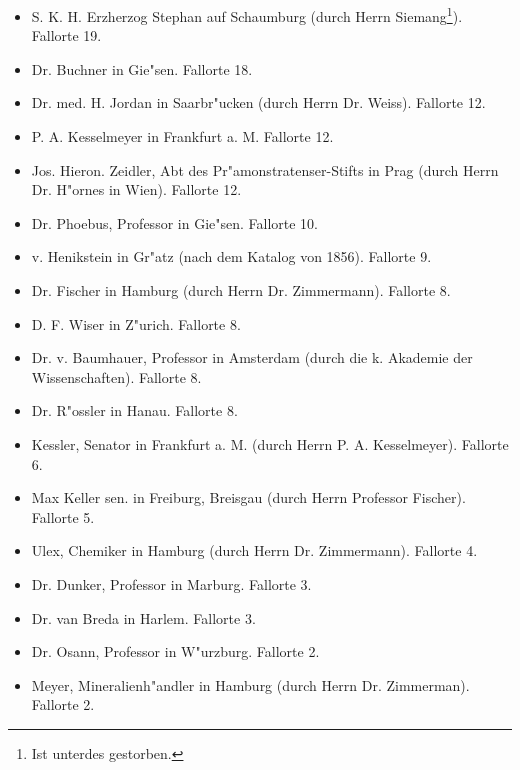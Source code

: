 \documentclass[a4paper, 11pt, oneside]{article}
\begin{document}
\begin{itemize}
    \item S. K. H. Erzherzog Stephan auf Schaumburg (durch Herrn Siemang\footnote{Ist unterdes gestorben.}). Fallorte 19.

    \item Dr. Buchner in Gie"sen. Fallorte 18.

    \item Dr. med. H. Jordan in Saarbr"ucken (durch Herrn Dr. Weiss). Fallorte 12.

    \item P. A. Kesselmeyer in Frankfurt a. M. Fallorte 12.

    \item Jos. Hieron. Zeidler, Abt des Pr"amonstratenser-Stifts in Prag (durch Herrn Dr. H"ornes in Wien). Fallorte 12.

    \item Dr. Phoebus, Professor in Gie"sen. Fallorte 10.

    \item v. Henikstein in Gr"atz (nach dem Katalog von 1856). Fallorte 9.

    \item Dr. Fischer in Hamburg (durch Herrn Dr. Zimmermann). Fallorte 8.

    \item D. F. Wiser in Z"urich. Fallorte 8.

    \item Dr. v. Baumhauer, Professor in Amsterdam (durch die k. Akademie der Wissenschaften). Fallorte 8.

    \item Dr. R"ossler in Hanau. Fallorte 8.

    \item Kessler, Senator in Frankfurt a. M. (durch Herrn P. A. Kesselmeyer). Fallorte 6.

    \item Max Keller sen. in Freiburg, Breisgau (durch Herrn Professor Fischer). Fallorte 5.

    \item Ulex, Chemiker in Hamburg (durch Herrn Dr. Zimmermann). Fallorte 4.

    \item Dr. Dunker, Professor in Marburg. Fallorte 3.

    \item Dr. van Breda in Harlem. Fallorte 3.

    \item Dr. Osann, Professor in W"urzburg. Fallorte 2.

    \item Meyer, Mineralienh"andler in Hamburg (durch Herrn Dr. Zimmerman). Fallorte 2.
\end{itemize}
\end{document}
